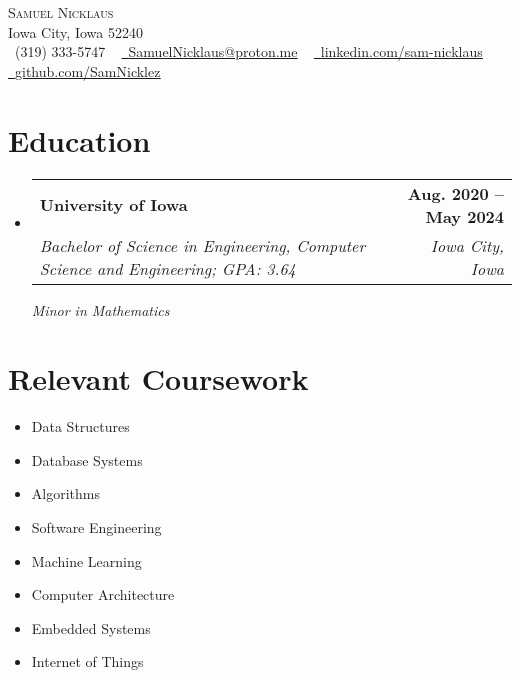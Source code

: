 \documentclass[letterpaper,11pt]{article}
\makeatletter
\newcommand{\resumeSubheading}[4]{
  \vspace{-2pt}\item
    \begin{tabular*}{1.0\textwidth}[t]{l@{\extracolsep{\fill}}r}
      \textbf{#1} & \textbf{\small #2} \\
      \textit{\small#3} & \textit{\small #4} \\
    \end{tabular*}\vspace{-7pt}
}
\newcommand{\resumeSubHeadingListStart}{\begin{itemize}[leftmargin=0.0in, label={}]}
\newcommand{\resumeSubHeadingListEnd}{\end{itemize}}
\makeatother
\begin{document}
\begin{center}
    {\Huge \scshape Samuel Nicklaus} \\ \vspace{1pt}
    Iowa City, Iowa 52240 \\ \vspace{1pt}
    \small \raisebox{-0.1\height}\faPhone\ {(319) 333-5747} ~ \href{mailto:samuelnicklaus@proton.me}{\raisebox{-0.2\height}\faEnvelope\  \underline{SamuelNicklaus@proton.me}} ~ 
    \href{https://linkedin.com/in/sam-nicklaus}{\raisebox{-0.2\height}\faLinkedin\ \underline{linkedin.com/sam-nicklaus}}  ~
    \href{https://github.com/SamNicklez}{\raisebox{-0.2\height}\faGithubSquare\ \underline{github.com/SamNicklez}}
\end{center}

\section{Education}
 \vspace{2pt}
  \resumeSubHeadingListStart
    \resumeSubheading
      {University of Iowa}{Aug. 2020 -- May 2024}
    {Bachelor of Science in Engineering, Computer Science and Engineering; GPA: 3.64
    }{Iowa City, Iowa}
    \vspace{2pt}
    \newline
        \emph
            {Minor in Mathematics}
                \vspace{-2pt}
  \resumeSubHeadingListEnd
  
\section{Relevant Coursework}
 \vspace{2pt}
        \begin{multicols}{4}
            \begin{itemize}[itemsep=-5pt, parsep=5pt]
                \item\small Data Structures
                \item Database Systems
                \item Algorithms
                \item Software Engineering
                \item Machine Learning
                \item Computer Architecture
                \item Embedded Systems
                \item Internet of Things
            \end{itemize}
        \end{multicols}
\end{document}
